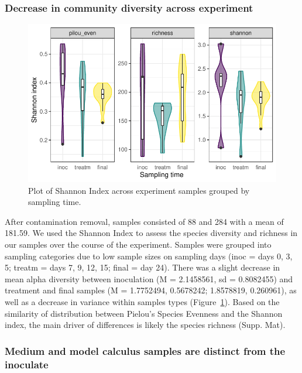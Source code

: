 \documentclass[
]{article}
\begin{document}
\hypertarget{decrease-in-community-diversity-across-experiment}{%
\subsubsection{Decrease in community diversity across
experiment}\label{decrease-in-community-diversity-across-experiment}}

\begin{figure}

{\centering \includegraphics{figures/fig-shannon-byoc-1.pdf}

}

\caption{\label{fig-shannon-byoc}Plot of Shannon Index across experiment
samples grouped by sampling time.}

\end{figure}

After contamination removal, samples consisted of 88 and 284 with a mean
of 181.59. We used the Shannon Index to assess the species diversity and
richness in our samples over the course of the experiment. Samples were
grouped into sampling categories due to low sample sizes on sampling
days (inoc = days 0, 3, 5; treatm = days 7, 9, 12, 15; final = day 24).
There was a slight decrease in mean alpha diversity between inoculation
(M = 2.1458561, sd = 0.8082455) and treatment and final samples (M =
1.7752494, 0.5678242; 1.8578819, 0.260961), as well as a decrease in
variance within samples types (Figure~\ref{fig-shannon-byoc}). Based on
the similarity of distribution between Pielou's Species Evenness and the
Shannon index, the main driver of differences is likely the species
richness (Supp. Mat).

\hypertarget{medium-and-model-calculus-samples-are-distinct-from-the-inoculate}{%
\subsubsection{Medium and model calculus samples are distinct from the
inoculate}\label{medium-and-model-calculus-samples-are-distinct-from-the-inoculate}}
\end{document}
